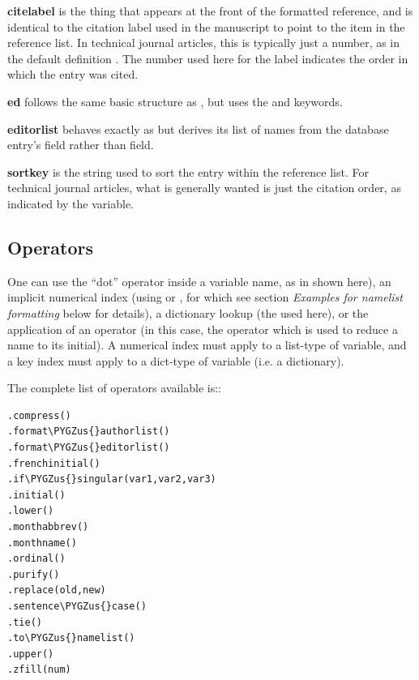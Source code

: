 \documentclass[letterpaper,10pt,english]{sphinxmanual}
\def\PYGZus{\char`\_}
\begin{document}
\textbf{citelabel} is the thing that appears at the front of the formatted reference, and is identical to the citation label used in the manuscript to point to the item in the reference list. In technical journal articles, this is typically just a number, as in the default definition . The number used here for the label indicates the order in which the entry was cited.

\textbf{ed} follows the same basic structure as , but uses the  and  keywords.

\textbf{editorlist} behaves exactly as  but derives its list of names from the database entry's  field rather than  field.

\textbf{sortkey} is the string used to sort the entry within the reference list. For technical journal articles, what is generally wanted is just the citation order, as indicated by the  variable.


\subsection{Operators}
\label{guidelines_for_writing_style_templates:operators}
One can use the ``dot'' operator inside a variable name, as in  shown here), an implicit numerical index (using  or , for which see section \emph{Examples for namelist formatting} below for details), a dictionary lookup (the  used here), or the application of an operator (in this case, the  operator which is used to reduce a name to its initial). A numerical index must apply to a list-type of variable, and a key index must apply to a dict-type of variable (i.e. a dictionary).

The complete list of operators available is::

\begin{Verbatim}[commandchars=\\\{\}]
.compress()
.format\PYGZus{}authorlist()
.format\PYGZus{}editorlist()
.frenchinitial()
.if\PYGZus{}singular(var1,var2,var3)
.initial()
.lower()
.monthabbrev()
.monthname()
.ordinal()
.purify()
.replace(old,new)
.sentence\PYGZus{}case()
.tie()
.to\PYGZus{}namelist()
.upper()
.zfill(num)
\end{Verbatim}
\end{document}
